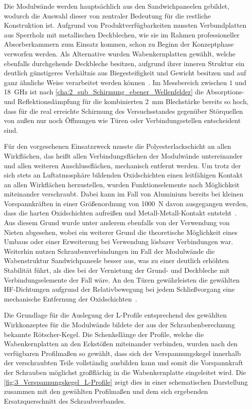Die Modulwände werden hauptsächlich aus den Sandwichpaneelen gebildet, wodurch die Auswahl dieser von zentraler Bedeutung für die restliche Konstruktion ist. Aufgrund von Produktverfügbarkeiten mussten Verbundplatten aus Sperrholz mit metallischen Deckblechen, wie sie im Rahmen professioneller Absorberkammern zum Einsatz kommen, schon zu Beginn der Konzeptphase verworfen werden. Als Alternative wurden Wabenkernplatten gewählt, welche ebenfalls durchgehende Deckbleche besitzen, aufgrund ihrer inneren Struktur ein deutlich günstigeres Verhältnis aus Biegesteifigkeit und Gewicht besitzen und auf ganz ähnliche Weise verarbeitet werden können~\cite{Alucore-Datenblatt}. Im Messbereich zwischen $1$ und \SI{18}{\giga\hertz} ist nach \Abschnitt\ref{cha:2_sub_Schirmung_ebener_Wellenfelder} die Absorptions- und Reflektionsdämpfung für die kombinierten \SI{2}{\milli\meter} Blechstärke bereits so hoch, dass für die real erreichte Schirmung des Versuchsstandes gegenüber Störquellen von außen nur noch Öffnungen wie Türen oder Verbindungsstellen entscheident sind.  
\par
\vspace{\linespace}
Für den vorgesehenen Einsatzzweck musste die Polyesterlackschicht an allen Wirkflächen, das heißt allen Verbindungsflächen der Modulwände untereinander und allen weiteren Anschlussflächen, mechanisch entfernt werden. Um trotz der sich stets an Luftatmosphäre bildenden Oxidschichten einen leitfähigen Kontakt an allen Wirkflächen herzustellen, wurden Funktionselemente nach Möglichkeit miteinander verschraubt. Dabei kann im Fall von Aluminium bereits bei kleinen Vorspannkräften in einer Größenordnung von \SI{1000}{\newton} davon ausgegangen werden, dass die harten Oxidschichten aufreißen und Metall-Metall-Kontakt entsteht~\cite{Projektarbeit}. Aus diesem Grund wurde unter anderem ebenfalls von der Verwendung von Nieten abgesehen, wobei ein weiterer Grund die theoretische Möglichkeit eines Umbaus oder einer Erweiterung bei Verwendung lösbarer Verbindungen war. Weiterhin nutzen Schraubenverbindungen im Fall der Modulwände die Wabenstruktur Sandwichpaneele besser aus, was zu einer deutlich erhöhten Stabilität führt, als dies bei der Vernietung der Grund- und Deckbleche mit Verbindungselemente der Fall wäre. An den Türen gewährleisten die gewählten HF-Dichtungen aufgrund der Relativbewegung bei jedem Schließvorgang eine mechanische Entfernung der Oxidschichten~\cite{EM_Schirmung}.
\par
\vspace{\linespace}
Die Grundlage für die Auslegung der L-Profile entsprechend des gewählten Wirkkonzeptes für die Modulwände bildete der aus der Schraubenberechnung bekannte Rötscher-Kegel. Die Schenkellänge der Profile, welche die Wabenkernplatten an den Eckstößen miteinander verbinden, wurden nach den verfügbaren Profilmaßen so gewählt, dass sich der Verspannungskegel innerhalb der verschraubten Teile vollständig ausbilden kann und somit die Vorspannkraft der Schrauben möglichst großflächig in die Wabenkernplatte eingeleitet wird. Die \Abb\ref{fig:3_Verspannungskegel_L-Profile} zeigt dies in einer schematischen Darstellung zusammen mit den gewählten Profilmaßen und dem sich ergebenden Ersatzquerschnitt des Schraubverbandes. 


